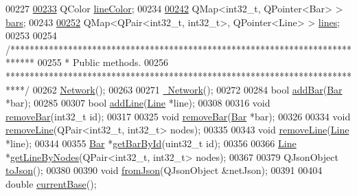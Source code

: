 \begin{DoxyCode}
00227 
\hypertarget{network_8h_source_l00233}{}\hyperlink{class_network_a453db7f1a994603fe4d38ac5899eb09c}{00233}   QColor \hyperlink{class_network_a453db7f1a994603fe4d38ac5899eb09c}{lineColor};
00234 
\hypertarget{network_8h_source_l00242}{}\hyperlink{class_network_ae37a8418e42adf765b143cdc9d992b6c}{00242}   QMap<int32\_t, QPointer<Bar> > \hyperlink{class_network_ae37a8418e42adf765b143cdc9d992b6c}{bars};
00243 
\hypertarget{network_8h_source_l00252}{}\hyperlink{class_network_a49659f95d02baf087707c5a94fa23d90}{00252}   QMap<QPair<int32\_t, int32\_t>, QPointer<Line> > \hyperlink{class_network_a49659f95d02baf087707c5a94fa23d90}{lines};
00253 
00254   \textcolor{comment}{/*****************************************************************************}
00255 \textcolor{comment}{   * Public methods.}
00256 \textcolor{comment}{   ****************************************************************************/}
00262   \hyperlink{group___models_ga3cc2fb4f8fa4d507077e8da85ce5a1c8}{Network}();
00263 
00271   \hyperlink{group___models_ga7a4e19cdb4bf0c7ecf82baa643831492}{~Network}();
00272 
00284   \textcolor{keywordtype}{bool} \hyperlink{group___models_ga8c5dfef0216731246f7411e1a5fbee01}{addBar}(\hyperlink{class_bar}{Bar} *bar);
00285 
00307   \textcolor{keywordtype}{bool} \hyperlink{group___models_gae02945131494987b3ff9b59b627719b4}{addLine}(\hyperlink{class_line}{Line} *line);
00308 
00316   \textcolor{keywordtype}{void} \hyperlink{group___models_ga997ce4f03d316b9f138f2e64e6ca400c}{removeBar}(int32\_t \textcolor{keywordtype}{id});
00317 
00325   \textcolor{keywordtype}{void} \hyperlink{group___models_ga997ce4f03d316b9f138f2e64e6ca400c}{removeBar}(\hyperlink{class_bar}{Bar} *bar);
00326 
00334   \textcolor{keywordtype}{void} \hyperlink{group___models_ga1eef3317224a7a06348fce07e581a9ad}{removeLine}(QPair<int32\_t, int32\_t> nodes);
00335 
00343   \textcolor{keywordtype}{void} \hyperlink{group___models_ga1eef3317224a7a06348fce07e581a9ad}{removeLine}(\hyperlink{class_line}{Line} *line);
00344 
00355   \hyperlink{class_bar}{Bar} *\hyperlink{group___models_ga04d524ce0fa0dd0d06deda92b1597af0}{getBarById}(uint32\_t \textcolor{keywordtype}{id});
00356 
00366   \hyperlink{class_line}{Line} *\hyperlink{group___models_ga8f090b85a7779695cb9f05b6395b3044}{getLineByNodes}(QPair<int32\_t, int32\_t> nodes);
00367 
00379   QJsonObject \hyperlink{group___models_ga1bb9773d3935eefef84136d388786494}{toJson}();
00380 
00390   \textcolor{keywordtype}{void} \hyperlink{group___models_ga2aef0f6c0d9569ec4d6b948d1ef0d5f1}{fromJson}(QJsonObject &netJson);
00391 
00404   \textcolor{keywordtype}{double} \hyperlink{group___models_ga433bc5c32cf2ce5329bb40b21952d885}{currentBase}();

\end{DoxyCode}
